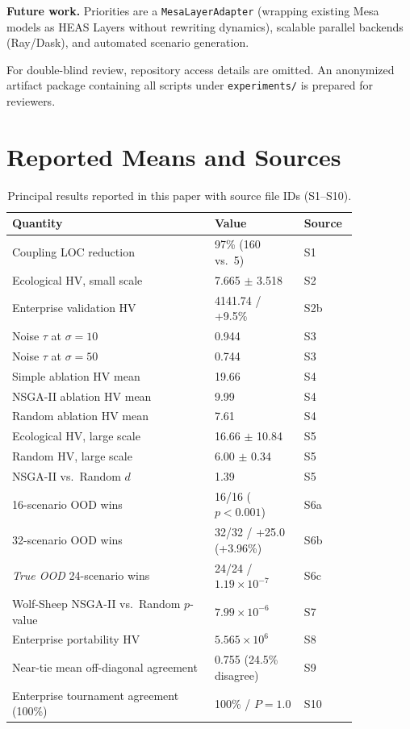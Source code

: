 \documentclass{wscpaperproc}
\begin{document}
\textbf{Future work.} Priorities are a \texttt{MesaLayerAdapter} (wrapping existing
Mesa models as HEAS Layers without rewriting dynamics), scalable parallel backends
(Ray/Dask), and automated scenario generation.

For double-blind review, repository access details are omitted. An anonymized
artifact package containing all scripts under \texttt{experiments/} is prepared
for reviewers.

\appendix
\section{Reported Means and Sources}

\begin{table}[ht]
\caption{Principal results reported in this paper with source file IDs (S1--S10).}
\label{tab:appendix-results}
\centering\small
\begin{tabular}{p{0.52\linewidth}p{0.23\linewidth}p{0.1\linewidth}}
\toprule
Quantity & Value & Source \\
\midrule
Coupling LOC reduction & 97\% (160 vs.\ 5) & S1 \\
Ecological HV, small scale & 7.665 $\pm$ 3.518 & S2 \\
Enterprise validation HV & 4141.74 / +9.5\% & S2b \\
Noise $\tau$ at $\sigma\!=\!10$ & 0.944 & S3 \\
Noise $\tau$ at $\sigma\!=\!50$ & 0.744 & S3 \\
Simple ablation HV mean & 19.66 & S4 \\
NSGA-II ablation HV mean & 9.99 & S4 \\
Random ablation HV mean & 7.61 & S4 \\
\midrule
Ecological HV, large scale & 16.66 $\pm$ 10.84 & S5 \\
Random HV, large scale & 6.00 $\pm$ 0.34 & S5 \\
NSGA-II vs.\ Random $d$ & 1.39 & S5 \\
16-scenario OOD wins & 16/16 ($p\!<\!0.001$) & S6a \\
32-scenario OOD wins & 32/32 / +25.0 (+3.96\%) & S6b \\
\textit{True OOD} 24-scenario wins & 24/24 / $1.19\!\times\!10^{-7}$ & S6c \\
Wolf-Sheep NSGA-II vs.\ Random $p$-value & $7.99\!\times\!10^{-6}$ & S7 \\
Enterprise portability HV & $5.565\!\times\!10^{6}$ & S8 \\
Near-tie mean off-diagonal agreement & 0.755 (24.5\% disagree) & S9 \\
Enterprise tournament agreement (100\%) & 100\% / $P\!=\!1.0$ & S10 \\
\bottomrule
\end{tabular}
\end{table}
\end{document}
